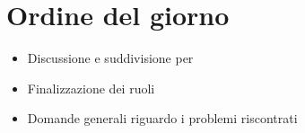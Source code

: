 \section{Ordine del giorno}
\begin{itemize}
\item Discussione e suddivisione per \AdR
\item Finalizzazione dei ruoli
\item Domande generali riguardo i problemi riscontrati
\end{itemize}